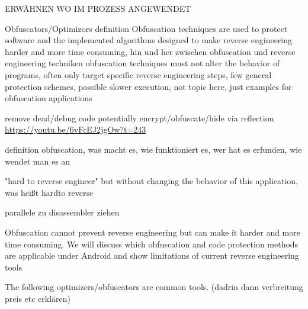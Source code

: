 ERWÄHNEN WO IM PROZESS ANGEWENDET\newline


Obfuscators/Optimizors definition\newline
Obfuscation techniques are used to protect software and the implemented algorithms\newline
designed to make reverse engineering harder and more time consuming, hin und her zwischen obfuscation und reverse engineering techniken\newline
obfuscation techniques must not alter the behavior of programs, often only target specific reverse engineering steps, few general protection schemes, possible slower execution, not topic here, just examples for obfuscation applications

remove dead/debug code\newline
potentially encrypt/obfuscate/hide via reflection\newline
\url{https://youtu.be/6vFcEJ2jgOw?t=243}\newline

definition obfuscation, was macht es, wie funktioniert es, wer hat es erfunden, wie wendet man es an\newline

"hard to reverse engineer" but without changing the behavior of this
application, was heißt hardto reverse\newline

parallele zu disassembler ziehen\newline

Obfuscation cannot prevent reverse engineering but can make it harder and more time consuming. We will discuss which obfuscation and code protection methods are applicable under Android and show limitations of current reverse engineering tools\newline

The following optimizers/obfuscators are common tools. (dadrin dann verbreitung preis etc erklären)
